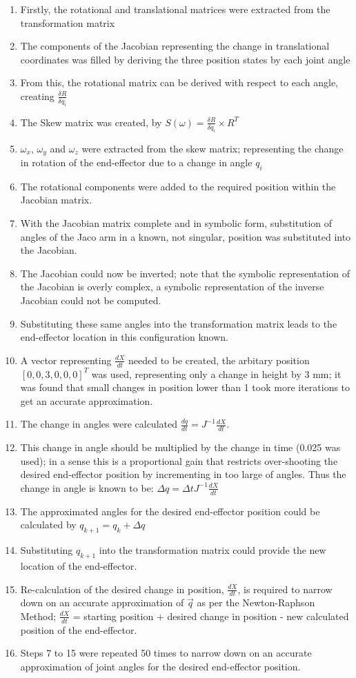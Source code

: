 \documentclass[12pt,openany,a4paper]{book}
\begin{document}
\begin{enumerate}
  \item Firstly, the rotational and translational matrices were extracted from the transformation matrix
  \item The components of the Jacobian representing the change in translational coordinates was filled by deriving the three position states by each joint angle
  \item From this, the rotational matrix can be derived with respect to each angle, creating $\frac{\delta R}{\delta q_i}$
  \item The Skew matrix was created, by $S(\omega) = \frac{\delta R}{\delta q_i} \times R^T$
  \item $\omega_x$, $\omega_y$ and $\omega_z$ were extracted from the skew matrix; representing the change in rotation of the end-effector due to a change in angle $q_i$ 
  \item The rotational components were added to the required position within the Jacobian matrix.
  \item With the Jacobian matrix complete and in symbolic form, substitution of angles of the Jaco arm in a known, not singular, position was substituted into the Jacobian.
  \item The Jacobian could now be inverted; note that the symbolic representation of the Jacobian is overly complex, a symbolic representation of the inverse Jacobian could not be computed.
  \item Substituting these same angles into the transformation matrix leads to the end-effector location in this configuration known.
  \item A vector representing $\frac{dX}{dt}$ needed to be created, the arbitary position $[0, 0, 3, 0, 0, 0]^T$ was used, representing only a change in height by 3 mm; it was found that small changes in position lower than 1 took more iterations to get an accurate approximation.
  \item The change in angles were calculated $\frac{dq}{dt} = J^{-1} \frac{dX}{dt}$.
  \item This change in angle should be multiplied by the change in time (0.025 was used); in a sense this is a proportional gain that restricts over-shooting the desired end-effector position by incrementing in too large of angles. Thus the change in angle is known to be: $\Delta q = \Delta t J^{-1} \frac{dX}{dt}$
  \item The approximated angles for the desired end-effector position could be calculated by $q_{k+1} = q_k + \Delta q$
  \item Substituting $q_{k+1}$ into the transformation matrix could provide the new location of the end-effector.
  \item Re-calculation of the desired change in position, $\frac{dX}{dt}$,  is required to narrow down on an accurate approximation of $\vec{q}$ as per the Newton-Raphson Method; $\frac{dX}{dt}$ = starting position + desired change in position - new calculated position of the end-effector.
  \item Steps 7 to 15 were repeated 50 times to narrow down on an accurate approximation of joint angles for the desired end-effector position.
\end{enumerate}
\end{document}
